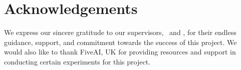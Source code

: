 \chapter*{Acknowledgements}

\vspace{10mm}
We express our sincere gratitude to our supervisors, \supervisorA \ and \supervisorB, for their endless guidance, support, and commitment towards the success of this project. We would also like to thank FiveAI, UK for providing resources and support in conducting certain experiments for this project. 


